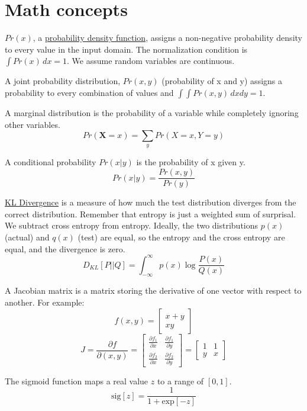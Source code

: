 \documentclass{article}
\begin{document}
\section{Math concepts}
$Pr(x)$, a \href{https://medium.com/@kavya8a/understanding-probability-density-functions-a-beginners-guide-06c9821ed5c0}{probability density function}, assigns a non-negative probability density to every value in the input domain. The normalization condition is $\int Pr(x)\,dx = 1$. We assume random variables are continuous.

A joint probability distribution, $Pr(x, y)$ (probability of x and y) assigns a probability to every combination of values and $\int \int Pr(x, y) \,dxdy = 1$.

A marginal distribution is the probability of a variable while completely ignoring other variables.
\[ Pr(\mathbf{X} = x) = \sum_{y} Pr(X = x, Y = y) \]

A conditional probability $Pr(x|y)$ is the probability of x given y.
\[ Pr(x|y) = \frac{Pr(x, y)}{Pr(y)} \]

\href{https://www.datacamp.com/tutorial/kl-divergence}{KL Divergence} is a measure of how much the test distribution diverges from the correct distribution. Remember that entropy is just a weighted sum of surprisal. We subtract cross entropy from entropy. Ideally, the two distributions $p(x)$ (actual) and $q(x)$ (test) are equal, so the entropy and the cross entropy are equal, and the divergence is zero.
\[ D_{KL}[P || Q] = \int_{-\infty}^{\infty} p(x)\log{\frac{P(x)}{Q(x)}} \]

A Jacobian matrix is a matrix storing the derivative of one vector with respect to another. For example:
\[ f(x, y) = \begin{bmatrix} x + y \\ xy \end{bmatrix} \]
\[ J = \frac{\partial f}{\partial (x, y)} = \begin{bmatrix} \frac{\partial f_1}{\partial x} & \frac{\partial f_1}{\partial y} \\ \frac{\partial f_2}{\partial x} & \frac{\partial f_2}{\partial y} \end{bmatrix} = \begin{bmatrix} 1 & 1 \\ y & x \end{bmatrix} \]

The sigmoid function maps a real value $z$ to a range of $[0, 1]$.
\[ \text{sig}[z] = \frac{1}{1 + \text{exp}[-z]} \]
\end{document}
